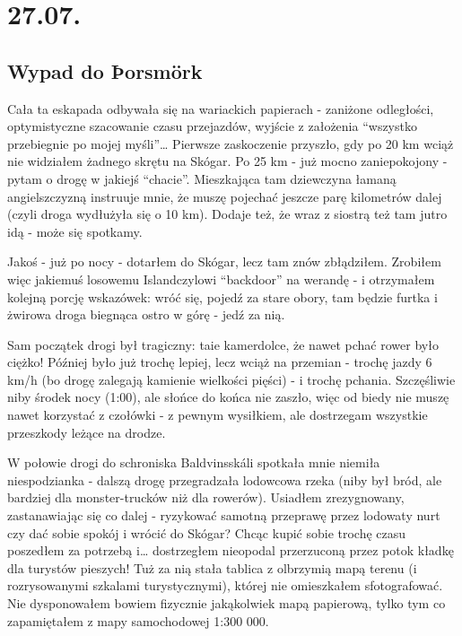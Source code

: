 \chapter*{27.07.}

\section*{Wypad do Þorsmörk}


Cała ta eskapada odbywała się na wariackich papierach - zaniżone odległości, optymistyczne szacowanie czasu przejazdów, wyjście z założenia “wszystko przebiegnie po mojej myśli”… Pierwsze zaskoczenie przyszło, gdy po 20 km wciąż nie widziałem żadnego skrętu na Skógar. Po 25 km - już mocno zaniepokojony - pytam o drogę w jakiejś “chacie”. Mieszkająca tam dziewczyna łamaną angielszczyzną instruuje mnie, że muszę pojechać jeszcze parę kilometrów dalej (czyli droga wydłużyła się o 10 km). Dodaje też, że wraz z siostrą też tam jutro idą - może się spotkamy.

Jakoś - już po nocy - dotarłem do Skógar, lecz tam znów zbłądziłem. Zrobiłem więc jakiemuś losowemu Islandczylowi “backdoor” na werandę - i otrzymałem kolejną porcję wskazówek: wróć się, pojedź za stare obory, tam będzie furtka i żwirowa droga biegnąca ostro w górę - jedź za nią.

Sam początek drogi był tragiczny: taie kamerdolce, że nawet pchać rower było ciężko! Później było już trochę lepiej, lecz wciąż na przemian - trochę jazdy 6 km/h (bo drogę zalegają kamienie wielkości pięści) - i trochę pchania. Szczęśliwie niby środek nocy (1:00), ale słońce do końca nie zaszło, więc od biedy nie muszę nawet korzystać z czołówki - z pewnym wysiłkiem, ale dostrzegam wszystkie przeszkody leżące na drodze.

W połowie drogi do schroniska Baldvinsskáli spotkała mnie niemiła niespodzianka - dalszą drogę przegradzała lodowcowa rzeka (niby był bród, ale bardziej dla monster-trucków niż dla rowerów). Usiadłem zrezygnowany, zastanawiając się co dalej - ryzykować samotną przeprawę przez lodowaty nurt czy dać sobie spokój i wrócić do Skógar? Chcąc kupić sobie trochę czasu poszedłem za potrzebą i… dostrzegłem nieopodal przerzuconą przez potok kładkę dla turystów pieszych! Tuż za nią stała tablica z olbrzymią mapą terenu (i rozrysowanymi szkalami turystycznymi), której nie omieszkałem sfotografować. Nie dysponowałem bowiem fizycznie jakąkolwiek mapą papierową, tylko tym co zapamiętałem z mapy samochodowej 1:300 000.

